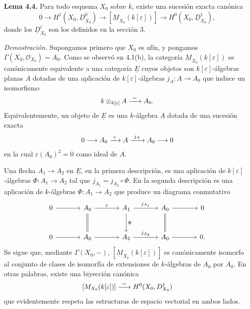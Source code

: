 
\medskip
\noindent\textbf{Lema 4.4.}
Para todo esquema $X_0$ sobre $k$, existe una sucesión exacta
canónica
\[
0\longrightarrow H^1(X_0,\underline D^0_{X_0})
\longrightarrow[\underline M_{X_0}(k[\varepsilon])]
\longrightarrow H^0(X_0,\underline D^1_{X_0}),
\]
donde los $\underline D^i_{X_0}$ son los definidos en la sección 3.

\medskip
\noindent\textit{Demostración.}
Supongamos primero que $X_0$ es afín, y pongamos
$\Gamma(X_0,\mathcal O_{X_0})=A_0$. Como se observó en 4.1(b), la
categoría $\underline M_{X_0}(k[\varepsilon])$ es canónicamente
equivalente a una categoría $\underline E$ cuyos objetos son
$k[\varepsilon]$-álgebras planas $A$ dotadas de una aplicación de
$k[\varepsilon]$-álgebras $j_A:A\longrightarrow A_0$ que induce un
isomorfismo
\[
k\otimes_{k[\varepsilon]}A\sisi{\overset{\sim}{\relbar\joinrel\relbar\joinrel\relbar}}{\xrightarrow{\ \sim\ }}A_0.
\]
Equivalentemente, un objeto de $\underline E$ es una $k$-álgebra $A$
dotada de una sucesión exacta
\[
0\longrightarrow A_0\sisi{\overset{\varepsilon}{\relbar\joinrel\relbar\joinrel\relbar}}{\xrightarrow{\ \varepsilon\ }}A
\sisi{\overset{j_A}{\relbar\joinrel\relbar\joinrel\relbar}}{\xrightarrow{\ j_A\ }}A_0\longrightarrow0
\]
en la cual $\varepsilon(A_0)^2=0$ como ideal de $A$.

Una flecha $A_1\longrightarrow A_2$ en $\underline E$, en la primera
descripción, es una aplicación de $k[\varepsilon]$-álgebras
$\Phi:A_1\longrightarrow A_2$ tal que
$j_{A_1}=j_{A_2}\circ\Phi$. En la segunda descripción es una
aplicación de $k$-álgebras $\Phi:A_1\longrightarrow A_2$ que produce
un diagrama conmutativo
\[
\begin{tikzcd}[column sep=large,row sep=large]
0 \arrow[r]
& A_0 \arrow[r,"\varepsilon"] \arrow[d,equal]
& A_1 \arrow[r,"j_{A_1}"] \arrow[d,"\Phi"]
& A_0 \arrow[r] \arrow[d,equal]
& 0 \\
0 \arrow[r]
& A_0 \arrow[r]
& A_2 \arrow[r,"j_{A_2}"]
& A_0 \arrow[r]
& 0.
\end{tikzcd}
\]
Se sigue que, mediante $\Gamma(X_0,-)$,
$[\underline M_{X_0}(k[\varepsilon])]$ es canónicamente isomorfo al
conjunto de clases de isomorfía de extensiones de $k$-álgebras de
$A_0$ por $A_0$. En otras palabras, existe una biyección canónica
\[
[\underline M_{X_0}(k[\varepsilon])]
\sisi{\overset{\sim}{\relbar\joinrel\relbar\joinrel\relbar}}{\xrightarrow{\ \sim\ }}H^0(X_0,\underline D^1_{X_0})
\]
que evidentemente respeta las estructuras de espacio vectorial en
ambos lados.

